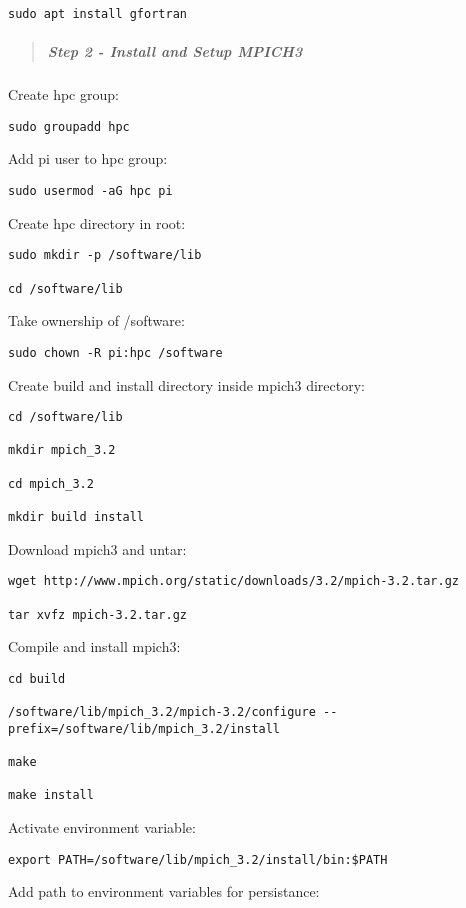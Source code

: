 \documentclass[]{article}
\let\oldsubparagraph\subparagraph
\renewcommand{\subparagraph}[1]{\oldsubparagraph{#1}\mbox{}}
\begin{document}
\begin{verbatim}
sudo apt install gfortran
\end{verbatim}

\begin{quote}
\mbox{}%
\subparagraph{Step 2 - Install and Setup
MPICH3}\label{step-2---install-and-setup-mpich3}
\end{quote}

Create hpc group:

\texttt{sudo\ groupadd\ hpc}

Add pi user to hpc group:

\texttt{sudo\ usermod\ -aG\ hpc\ pi}

Create hpc directory in root:

\begin{verbatim}
sudo mkdir -p /software/lib

cd /software/lib
\end{verbatim}

Take ownership of /software:

\texttt{sudo\ chown\ -R\ pi:hpc\ /software}

Create build and install directory inside mpich3 directory:

\begin{verbatim}
cd /software/lib

mkdir mpich_3.2

cd mpich_3.2

mkdir build install
\end{verbatim}

Download mpich3 and untar:

\begin{verbatim}
wget http://www.mpich.org/static/downloads/3.2/mpich-3.2.tar.gz

tar xvfz mpich-3.2.tar.gz
\end{verbatim}

Compile and install mpich3:

\begin{verbatim}
cd build

/software/lib/mpich_3.2/mpich-3.2/configure --prefix=/software/lib/mpich_3.2/install

make

make install
\end{verbatim}

Activate environment variable:

\texttt{export\ PATH=/software/lib/mpich\_3.2/install/bin:\$PATH}

Add path to environment variables for persistance:
\end{document}
